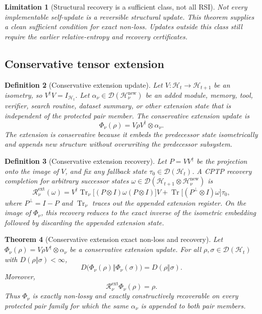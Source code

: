 \documentclass[11pt]{article}
\newtheorem{theorem}{Theorem}[section]
\newtheorem{definition}[theorem]{Definition}
\newtheorem{limitation}[theorem]{Limitation}
\newcommand{\D}{\mathcal{D}}
\newcommand{\Hcal}{\mathcal{H}}
\newcommand{\Rcal}{\mathcal{R}}
\newcommand{\Tr}{\operatorname{Tr}}
\newcommand{\1}{\mathbf{1}}
\begin{document}
\begin{limitation}[Structural recovery is a sufficient class, not all RSI]
Not every implementable self-update is a reversible structural update.  This theorem supplies a clean sufficient condition for exact non-loss.  Updates outside this class still require the earlier relative-entropy and recovery certificates.
\end{limitation}

\subsection{Conservative tensor extension}

\begin{definition}[Conservative extension update]
\label{def:conservative_extension_update}
Let \(V:\Hcal_t\to\Hcal_{t+1}\) be an isometry, so \(V^\dagger V=I_{\Hcal_t}\).  Let \(\alpha_\nu\in\D(\Hcal_{\nu}^{\mathrm{new}})\) be an added module, memory, tool, verifier, search routine, dataset summary, or other extension state that is independent of the protected pair member.  The conservative extension update is
\[
\boxed{
\Phi_\nu(\rho)=V\rho V^\dagger\otimes\alpha_\nu.
}
\]
The extension is conservative because it embeds the predecessor state isometrically and appends new structure without overwriting the predecessor subsystem.
\end{definition}

\begin{definition}[Conservative extension recovery]
\label{def:conservative_extension_recovery}
Let \(P=VV^\dagger\) be the projection onto the image of \(V\), and fix any fallback state \(\tau_0\in\D(\Hcal_t)\).  A CPTP recovery completion for arbitrary successor states \(\omega\in\D(\Hcal_{t+1}\otimes\Hcal_{\nu}^{\mathrm{new}})\) is
\[
\Rcal_\nu^{\mathrm{ext}}(\omega)
=
V^\dagger\Tr_{\nu}\!\bigl[(P\otimes I)\omega(P\otimes I)\bigr]V
+
\Tr\!\bigl[(P^\perp\otimes I)\omega\bigr]\tau_0,
\]
where \(P^\perp=I-P\) and \(\Tr_{\nu}\) traces out the appended extension register.  On the image of \(\Phi_\nu\), this recovery reduces to the exact inverse of the isometric embedding followed by discarding the appended extension state.
\end{definition}

\begin{theorem}[Conservative extension exact non-loss and recovery]
\label{thm:conservative_extension_exact_nonloss_recovery}
Let \(\Phi_\nu(\rho)=V\rho V^\dagger\otimes\alpha_\nu\) be a conservative extension update.  For all \(\rho,\sigma\in\D(\Hcal_t)\) with \(D(\rho\Vert\sigma)<\infty\),
\[
D\bigl(\Phi_\nu(\rho)\Vert\Phi_\nu(\sigma)\bigr)
=
D(\rho\Vert\sigma).
\]
Moreover,
\[
\Rcal_\nu^{\mathrm{ext}}\Phi_\nu(\rho)=\rho.
\]
Thus \(\Phi_\nu\) is exactly non-lossy and exactly constructively recoverable on every protected pair family for which the same \(\alpha_\nu\) is appended to both pair members.
\end{theorem}
\end{document}
